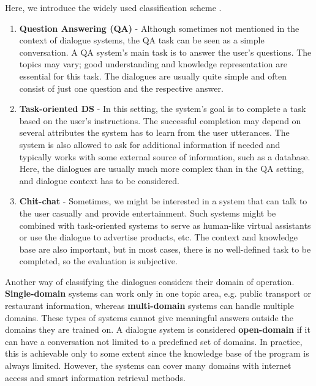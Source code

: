Here, we introduce the widely used classification scheme \cite{jurafsky2000speech}.
\begin{enumerate}
    \item \textbf{Question Answering (QA)} - Although sometimes not mentioned in the context of dialogue systems, the QA task can be seen as a simple conversation. A QA system's main task is to answer the user's questions.
    The topics may vary; good understanding and knowledge representation are essential for this task.
    The dialogues are usually quite simple and often consist of just one question and the respective answer.
    \item \textbf{Task-oriented DS} - In this setting, the system's goal is to complete a task based on the user's instructions.
    The successful completion may depend on several attributes the system has to learn from the user utterances.
    The system is also allowed to ask for additional information if needed and typically works with some external source of information, such as a database.
    Here, the dialogues are usually much more complex than in the QA setting, and dialogue context has to be considered.
    \item \textbf{Chit-chat} - Sometimes, we might be interested in a system that can talk to the user casually and provide entertainment.
    Such systems might be combined with task-oriented systems to serve as human-like virtual assistants or use the dialogue to advertise products, etc.
    The context and knowledge base are also important, but in most cases, there is no well-defined task to be completed, so the evaluation is subjective.
\end{enumerate}

Another way of classifying the dialogues considers their domain of operation.
\textbf{Single-domain} systems can work only in one topic area, e.g. public transport or restaurant information, whereas \textbf{multi-domain} systems can handle multiple domains.
These types of systems cannot give meaningful answers outside the domains they are trained on.
A dialogue system is considered \textbf{open-domain} if it can have a conversation not limited to a predefined set of domains.
In practice, this is achievable only to some extent since the knowledge base of the program is always limited.
However, the systems can cover many domains with internet access and smart information retrieval methods.


